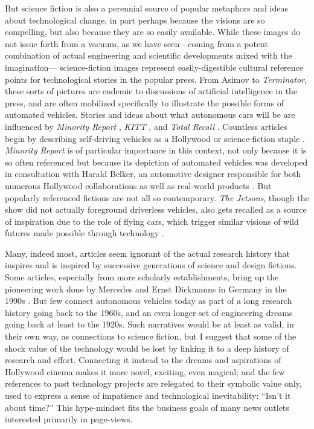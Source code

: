 But science fiction is also a perennial source of popular metaphors and ideas
about technological change, in part perhaps because the visions are so
compelling, but also because they are so easily available. While these images
do not issue forth from a vacuum, as we have seen---coming from a potent combination
of actual engineering and scientific developments mixed with the imagination---
science-fiction images represent easily-digestible cultural reference
points for technological stories in the popular press. From Asimov to \emph{Terminator},
these sorts of pictures are endemic to discussions of artificial
intelligence in the press, and are often mobilized specifically to
illustrate the possible forms of automated vehicles. Stories and ideas
about what autonomous cars will be are
influenced by \emph{Minority Report} \cite{fromHollywood}, \emph{KITT}
\cite{wadeKITT}, and \emph{Total
  Recall} \cite{pasdirtzSolution}. Countless articles begin by describing
self-driving vehicles as a Hollywood or science-fiction
staple \cite{scifiToReality}. \emph{Minority Report} is of particular
importance in this context, not only because it is so often referenced
but because its depiction of automated vehicles was developed in
consultation with Harald Belker, an automotive designer responsible
for both numerous Hollywood collaborations as well as real-world
products \cite{melansonMinority}. But popularly referenced fictions are
not all so contemporary. \emph{The Jetsons}, though
the show did not actually foreground driverless vehicles, also gets
recalled as a source of inspiration due to the role of flying cars,
which trigger similar visions of wild 
futures made possible through technology \cite{JetsonsAge}. 


Many, indeed most, articles seem ignorant of the actual research
history that inspires and is inspired by successive generations of
science and design fictions. Some articles, especially from more
scholarly establishments, bring up 
the pioneering work done by Mercedes and Ernst
Dickmanns in Germany in the 1990s \cite{HCRIDriverless}. But few connect
autonomous vehicles today as part of a long research history going
back to the 1960s, and an even longer set of engineering dreams going
back at least to the 1920s. Such narratives would be at least as
valid, in their own way, as connections to science fiction, but I
suggest that some of the shock value of the technology would be lost
by linking it to a deep history of research and effort. Connecting it
instead to the dreams and aspirations of Hollywood cinema makes it
more novel, exciting, even magical; and the few references to past
technology projects are relegated to their symbolic value only, used
to express a sense of impatience and technological inevitability: ``Isn't
it about time?'' This hype-mindset fits the business
goals of many news outlets interested primarily in page-views.

